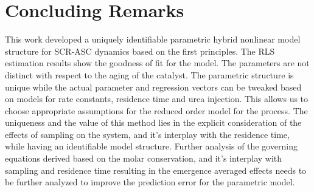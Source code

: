 \section{Concluding Remarks}
This work developed a uniquely identifiable parametric hybrid nonlinear model structure for SCR-ASC dynamics based on
the first principles. The RLS estimation results show the goodness of fit for the model. The parameters are not distinct
with respect to the aging of the catalyst. The parametric structure is unique while the actual parameter and regression
vectors can be tweaked based on models for rate constants, residence time and urea injection. This allows us to choose
appropriate assumptions for the reduced order model for the process. The uniqueness and the value of this method lies in
the explicit consideration of the effects of sampling on the system, and it's interplay with the residence time, while
having an identifiable model structure. Further analysis of the governing equations derived based on the molar
conservation, and it's interplay with sampling and residence time resulting in the emergence averaged effects needs to
be further analyzed to improve the prediction error for the parametric model.
